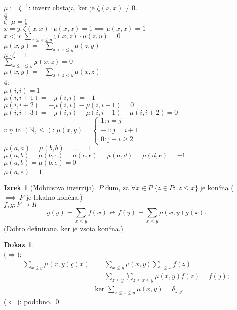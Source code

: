 \documentclass[a4paper, 12pt]{book}
\theoremstyle{definition}
\newtheorem{theorem}[counter]{Izrek}
\newtheorem{pro}[counter]{Dokaz}
\theoremstyle{remark}
\newcommand{\N}{\mathbb{N}}
\begin{document}
$\mu := \zeta^{-1}$: inverz obstaja, ker je $\zeta(x,x) \neq 0$. \\
$\underline{4}$ \\
$\zeta \cdot \mu = \underline{1}$ \\
$x = y: \zeta(x,x) \cdot \mu(x,x) = 1 \implies \mu(x,x) = 1$ \\
$x < y: \sum_{x \leq z \leq y} \zeta(x,z) \cdot \mu(z, y) = 0$ \\
$\mu(x,y) = -\sum_{x < z \leq y} \mu(z, y)$ \\
$\mu \cdot \zeta = \underline{1}$ \\
$\sum_{x \leq z \leq y} \mu(x, z) = 0$ \\
$\mu(x,y) = -\sum_{x \leq z < y} \mu(x, z)$ \\
$\underline{4}$: \\
$\mu(i, i) = 1$ \\
$\mu(i, i+1) = -\mu(i, i) = -1$ \\
$\mu(i, i+2) = -\mu(i, i) - \mu(i, i+1) = 0$ \\
$\mu(i, i+3) = -\mu(i, i) - \mu(i, i+1) - \mu(i, i+2) = 0$ \\
$v \; \underline{n}$ in $(\N, \leq)$:
$\mu(x,y) = \begin{cases}
  1: i = j \\
  -1: j = i + 1 \\
  0: j - i \geq 2
\end{cases}$ \\
$\mu(a, a) = \mu(b, b ) = \dots = 1$ \\
$\mu(a, b) = \mu(b, c) = \mu(c, e) = \mu(a, d) = \mu(d, e) = -1$ \\
$\mu(a, b) = \mu(b, e) = 0$ \\
$\mu(a, e) = 1$.
\begin{theorem}[Möbiusova inverzija]
  $P$ dum, za $\forall x \in P \; \{z \in P: \; z \leq x\}$ je končna ($\implies \; P$ je lokalno končna.) \\
  $f, g: P \to K$ \\
  \begin{equation*}
    g(y) = \sum_{x \leq y} f(x) \iff f(y) = \sum_{x \leq y} \mu(x, y) g(x).
  \end{equation*}
  (Dobro definirano, ker je vsota končna.)
\end{theorem}
\begin{pro} \text{} \\
  ($\Rightarrow$):
  \begin{align*}
    \sum_{x \leq y} \mu(x, y) g(x) &= \sum_{x \leq y} \mu(x, y) \sum_{z \leq x} f(z) \\
    &= \sum_{z \leq y} \sum_{z \leq x \leq y} \mu(x, y) f(z) = f(y); \\
    &\text{ker } \sum_{z \leq x \leq y} \mu(x, y) = \delta_{z, y}.
  \end{align*}
  ($\Leftarrow$): podobno.
  \qed
\end{pro}
\end{document}
